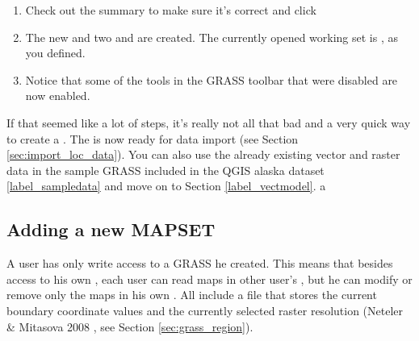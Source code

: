 \begin{enumerate}
  \footnote{When creating a new , GRASS automatically
  creates a special  called  designed to
  store the core data for the project, its default spatial extend and
  coordinate system definitions (Neteler \& Mitasova 2008
  \cite{neteler_mitasova08}).}
  \item Check out the summary to make sure it's correct and click
  \item The new  and two 
  and  are created. The currently opened working set is
  , as you defined.
  \item Notice that some of the tools in the GRASS toolbar that were
  disabled are now enabled.
\end{enumerate}

If that seemed like a lot of steps, it's really not all that bad and a very
quick way to create a . The  is
now ready for data import (see Section \ref{sec:import_loc_data}).
You can also use the already existing vector and raster data in the sample
GRASS  included in the QGIS alaska dataset
\ref{label_sampledata} and move on to Section \ref{label_vectmodel}.
a
\subsection{Adding a new MAPSET}\label{sec:add_mapset}

A user has only write access to a GRASS  he created. This
means that besides access to his own , each user can read
maps in other user's , but he can modify or remove only
the maps in his own . All  include a
 file that stores the current boundary coordinate values and
the currently selected raster resolution (Neteler \& Mitasova 2008
\cite{neteler_mitasova08}, see Section \ref{sec:grass_region}).

